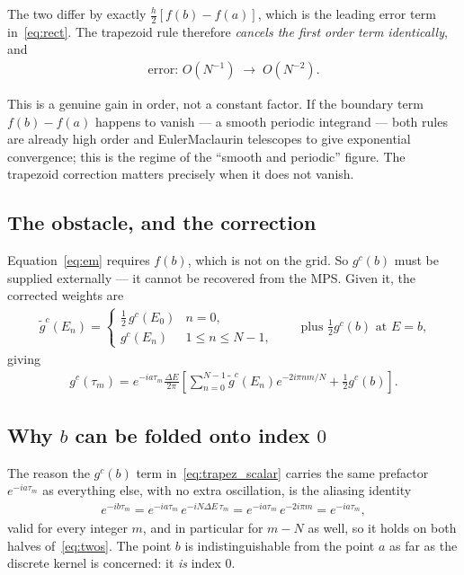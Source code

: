 \documentclass{article}
\begin{document}
	The two differ by exactly $\tfrac{h}{2}[f(b)-f(a)]$, which is the leading error
	term in~\eqref{eq:rect}. The trapezoid rule therefore \emph{cancels the first
		order term identically}, and
	\begin{align}
		\boxed{\;\text{error: } O(N^{-1}) \;\longrightarrow\; O(N^{-2}).\;}
	\end{align}
	
	This is a genuine gain in order, not a constant factor. If the boundary term
	$f(b)-f(a)$ happens to vanish --- a smooth periodic integrand --- both rules are
	already high order and Euler\textendash{}Maclaurin telescopes to give exponential
	convergence; this is the regime of the ``smooth and periodic'' figure. The
	trapezoid correction matters precisely when it does not vanish.
	
	\subsection{The obstacle, and the correction}
	
	Equation~\eqref{eq:em} requires $f(b)$, which is not on the grid. So $g^c(b)$
	must be supplied externally --- it cannot be recovered from the MPS\@. Given it,
	the corrected weights are
	\begin{align}
		\tilde{g}^c(E_n) = \begin{cases}
			\tfrac12\,g^c(E_0) & n = 0,\\
			g^c(E_n)           & 1 \le n \le N-1,
		\end{cases}
		\qquad \text{plus } \tfrac12 g^c(b) \text{ at } E = b,
	\end{align}
	giving
	\begin{align}
		g^{c}(\tau_m) = e^{-ia\tau_m}\frac{\Delta E}{2\pi}
		\left[\sum_{n=0}^{N-1} \tilde{g}^c(E_n)e^{-2i\pi nm/N}
		+ \tfrac12 g^c(b)\right].
		\label{eq:trapez_scalar}
	\end{align}
	
	\subsection{Why $b$ can be folded onto index $0$}
	
	The reason the $g^c(b)$ term in~\eqref{eq:trapez_scalar} carries the same
	prefactor $e^{-ia\tau_m}$ as everything else, with no extra oscillation, is the
	aliasing identity
	\begin{align}
		e^{-ib\tau_m} = e^{-ia\tau_m}\,e^{-iN\Delta E\,\tau_m}
		= e^{-ia\tau_m}\,e^{-2i\pi m}
		= e^{-ia\tau_m},
		\label{eq:alias}
	\end{align}
	valid for every integer $m$, and in particular for $m-N$ as well, so it holds on
	both halves of~\eqref{eq:twos}. The point $b$ is indistinguishable from the
	point $a$ as far as the discrete kernel is concerned: it \emph{is} index $0$.
	
\end{document}
